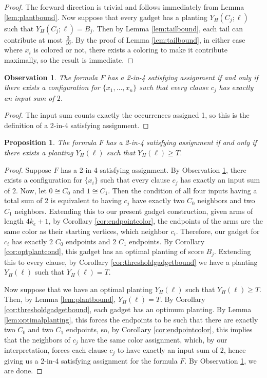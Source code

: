 \documentclass[11pt]{article}
\theoremstyle{plain}
\newtheorem{proposition}[theorem]{Proposition}
\newtheorem{observation}[theorem]{Observation}
\begin{document}
\begin{proof}
    The forward direction is trivial and follows immediately from Lemma \ref{lem:plantbound}. Now suppose that every gadget has a planting $Y_H(C_j; \ell)$ such that $Y_H(C_j; \ell) = B_j$. Then by Lemma \ref{lem:tailbound}, each tail can contribute at most $\frac{3}{10}$. By the proof of Lemma \ref{lem:tailbound}, in either case where $x_i$ is colored or not, there exists a coloring to make it contribute maximally, so the result is immediate. 
\end{proof}

\begin{observation} \label{obs:sattogadget}
    The formula $F$ has a 2-in-4 satisfying assignment if and only if there exists a configuration for $\{x_1, \dots, x_n\}$ such that every clause $c_j$ has exactly an input sum of $2$. 
\end{observation}

\begin{proof}
    The input sum counts exactly the occurrences assigned 1, so this is the definition of a 2-in-4 satisfying assignment.
\end{proof}

\begin{proposition} \label{prop:equivalence}
    The formula $F$ has a 2-in-4 satisfying assignment if and only if there exists a planting $Y_H(\ell)$ such that $Y_H(\ell) \geq T$. 
\end{proposition}

\begin{proof}
    Suppose $F$ has a 2-in-4 satisfying assignment. By Observation \ref{obs:sattogadget}, there exists a configuration for $\{x_i\}$ such that every clause $c_j$ has exactly an input sum of $2$. Now, let $0 \cong C_0$ and $1 \cong C_1$. Then the condition of all four inputs having a total sum of 2 is equivalent to having $c_j$ have exactly two $C_0$ neighbors and two $C_1$ neighbors. Extending this to our present gadget construction, given arms of length $4k_e + 1$, by Corollary \ref{cor:endpointcolor}, the endpoints of the arms are the same color as their starting vertices, which neighbor $c_i$. Therefore, our gadget for $c_i$ has exactly $2$ $C_0$ endpoints and $2$ $C_1$ endpoints. By Corollary \ref{cor:optplantcond}, this gadget has an optimal planting of score $B_j$. Extending this to every clause, by Corollary \ref{cor:thresholdgadgetbound} we have a planting $Y_H(\ell)$ such that $Y_H(\ell) = T$.

    Now suppose that we have an optimal planting $Y_H(\ell)$ such that $Y_H(\ell) \geq T$. Then, by Lemma \ref{lem:plantbound}, $Y_H(\ell) = T$. By Corollary \ref{cor:thresholdgadgetbound}, each gadget has an optimum planting. By Lemma \ref{lem:optimalplanting}, this forces the endpoints to be such that there are exactly two $C_0$ and two $C_1$ endpoints, so, by Corollary \ref{cor:endpointcolor}, this implies that the neighbors of $c_j$ have the same color assignment, which, by our interpretation, forces each clause $c_j$ to have exactly an input sum of $2$, hence giving us a 2-in-4 satisfying assignment for the formula $F$. By Observation \ref{obs:sattogadget}, we are done. 
\end{proof}



\end{document}

